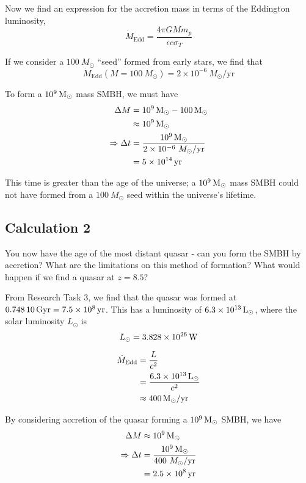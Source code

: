\documentclass[a4paper]{article} %
\newcommand{\ms}[1]{\SI{#1}{M_{\odot}}}
\begin{document}
Now we find an expression for the accretion mass in terms of the Eddington luminosity,
\begin{equation}
\dot{M}_{\text{Edd}}=\frac{4\pi GMm_p}{\epsilon c\sigma_T}
\end{equation}

If we consider a $\ms{100}$ ``seed'' formed from early stars, we find that
\begin{equation}
\dot{M}_{\text{Edd}}(M=\ms{100})=2\times 10^{-6}~M_{\odot}/\text{yr}
\end{equation}

To form a $\ms{d9}$ mass SMBH, we must have
\begin{align}
\Delta M&=\ms{d9}-\ms{100}\\
&\approx \ms{d9}\\
\Rightarrow \Delta t&=\frac{\ms{d9}}{2\times 10^{-6}~M_{\odot}/\text{yr}}\\
&=\SI{5d14}{yr}
\end{align}

This time is greater than the age of the universe; a $\ms{d9}$ mass SMBH could not have formed from a $\ms{100}$ seed within the universe's lifetime.



\subsection{Calculation 2}
\begin{framed}
You now have the age of the most distant quasar - can you form the SMBH by accretion? What are the limitations on this method of formation? What would happen if we find a quasar at $z=8.5$?
\end{framed}

From Research Task 3, we find that the quasar was formed at $\SI{0.74810}{Gyr}=\SI{7.5d8}{yr}$. This has a luminosity of $\SI{6.3d13}{L_\odot}$, where the solar luminosity $L_{\odot}$ is
\begin{equation}
L_{\odot}=\SI{3.828d26}{W}
\end{equation}

\begin{align}
\dot{M}_{\text{Edd}}&=\frac{L}{c^2}\\
&=\frac{\SI{6.3d13}{L_\odot}}{c^2}\\
&\approx \ms{400}/\text{yr}
\end{align}

By considering accretion of the quasar forming a $\ms{d9}$ SMBH, we have
\begin{align}
\Delta M&\approx \ms{d9}\\
\Rightarrow \Delta t&=\frac{\ms{d9}}{400~M_{\odot}/\text{yr}}\\
&=\SI{2.5d8}{yr}
\end{align}
\end{document}
